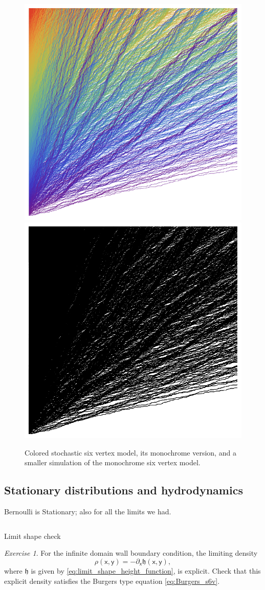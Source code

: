 \documentclass[letterpaper,11pt,oneside,reqno]{article}
\numberwithin{equation}{section}
\theoremstyle{definition}
\theoremstyle{remark}
\newtheorem{exercise}{Exercise}[section]
\begin{document}
\begin{figure}[htpb]
	\centering
	\includegraphics[width=.3\textwidth]{./images/CS6V.png}
	\quad
	\includegraphics[width=.3\textwidth]{./images/S6V.png}
	\quad
	\caption{Colored stochastic six vertex model, its monochrome version,
	and a smaller simulation of the monochrome six vertex model.}
	\label{fig:CS6V}
\end{figure}

\subsection{Stationary distributions and hydrodynamics}
\label{sub:hydrodynamic_analysis}




Bernoulli is Stationary; also for all the limits we had.

\begin{equation}
	\label{eq:Burgers_s6v}
\end{equation}

Limit shape check


\begin{exercise}
	For the infinite domain wall boundary condition,
	the limiting 
	density
	\begin{equation*}
		\rho(\mathsf{x},\mathsf{y})=-\partial_\mathsf{x} \mathfrak{h}(\mathsf{x},\mathsf{y}),
	\end{equation*}
	where $\mathfrak{h}$ is 
	given by \eqref{eq:limit_shape_height_function},
	is explicit. Check that this explicit density
	satisfies the Burgers type equation
	\eqref{eq:Burgers_s6v}.
\end{exercise}
\end{document}
